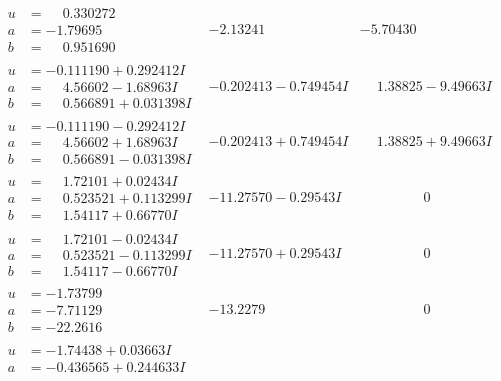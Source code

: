 \documentclass[1p]{elsarticle_modified}
\theoremstyle{definition}
\begin{document}
$$\begin{array}{c|c|c}
\begin{aligned}
u &= \phantom{-}0.330272\phantom{ +0.000000I} \\
a &= -1.79695\phantom{ +0.000000I} \\
b &= \phantom{-}0.951690\phantom{ +0.000000I}\end{aligned}
 & -2.13241\phantom{ +0.000000I} & -5.70430\phantom{ +0.000000I} \\ \hline\begin{aligned}
u &= -0.111190 + 0.292412 I \\
a &= \phantom{-}4.56602 - 1.68963 I \\
b &= \phantom{-}0.566891 + 0.031398 I\end{aligned}
 & -0.202413 - 0.749454 I & \phantom{-}1.38825 - 9.49663 I \\ \hline\begin{aligned}
u &= -0.111190 - 0.292412 I \\
a &= \phantom{-}4.56602 + 1.68963 I \\
b &= \phantom{-}0.566891 - 0.031398 I\end{aligned}
 & -0.202413 + 0.749454 I & \phantom{-}1.38825 + 9.49663 I \\ \hline\begin{aligned}
u &= \phantom{-}1.72101 + 0.02434 I \\
a &= \phantom{-}0.523521 + 0.113299 I \\
b &= \phantom{-}1.54117 + 0.66770 I\end{aligned}
 & -11.27570 - 0.29543 I & \phantom{-0.000000 } 0 \\ \hline\begin{aligned}
u &= \phantom{-}1.72101 - 0.02434 I \\
a &= \phantom{-}0.523521 - 0.113299 I \\
b &= \phantom{-}1.54117 - 0.66770 I\end{aligned}
 & -11.27570 + 0.29543 I & \phantom{-0.000000 } 0 \\ \hline\begin{aligned}
u &= -1.73799\phantom{ +0.000000I} \\
a &= -7.71129\phantom{ +0.000000I} \\
b &= -22.2616\phantom{ +0.000000I}\end{aligned}
 & -13.2279\phantom{ +0.000000I} & \phantom{-0.000000 } 0 \\ \hline\begin{aligned}
u &= -1.74438 + 0.03663 I \\
a &= -0.436565 + 0.244633 I \\

\end{aligned}
\end{array}$$
\end{document}
